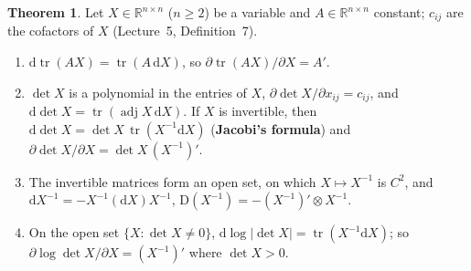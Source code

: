 \documentclass[12pt]{article}
\newcommand{\R}{\mathbb R}
\DeclareMathOperator{\tr}{tr}
\theoremstyle{definition}
\newtheorem{theorem}{Theorem}
\newcommand{\lec}[1]{Lecture~#1}
\DeclareMathOperator{\adj}{adj}
\begin{document}
\begin{theorem}\label{b16.26}
Let \(X\in\R^{n\times n}\) (\(n\geqslant2\)) be a variable and \(A\in\R^{n\times n}\) constant; \(c_{ij}\) are the
cofactors of \(X\) (\lec{5}, Definition~7).
\begin{enumerate}
\item \(\mathrm{d}\tr(AX)=\tr(A\,\mathrm{d}X)\), so \(\partial\tr(AX)/\partial X=A'\).
\item \(\det X\) is a polynomial in the entries of \(X\), \(\partial\det X/\partial x_{ij}=c_{ij}\), and
\(\mathrm{d}\det X=\tr(\adj X\,\mathrm{d}X)\). If \(X\) is invertible, then
\(\mathrm{d}\det X=\det X\,\tr(X^{-1}\mathrm{d}X)\) (\textbf{Jacobi's formula}) and
\(\partial\det X/\partial X=\det X\,(X^{-1})'\).
\item The invertible matrices form an open set, on which \(X\mapsto X^{-1}\) is \(C^2\), and
\(\mathrm{d}X^{-1}=-X^{-1}(\mathrm{d}X)X^{-1}\), \(\mathrm D(X^{-1})=-(X^{-1})'\otimes X^{-1}\).
\item On the open set \(\{X:\det X\ne0\}\), \(\mathrm{d}\log\lvert\det X\rvert=\tr(X^{-1}\mathrm{d}X)\); so
\(\partial\log\det X/\partial X=(X^{-1})'\) where \(\det X>0\).
\end{enumerate}
\end{theorem}
\end{document}
